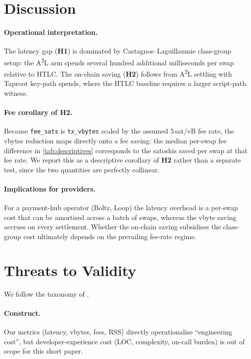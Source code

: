 \documentclass[sigconf,nonacm]{acmart}
\newcommand{\atwol}{A\textsuperscript{2}L\xspace}
\newcommand{\hyplabel}[1]{\textbf{H#1}}
\newcommand{\code}[1]{\texttt{\small #1}}
\begin{document}
\section{Discussion}
\label{sec:discussion}

\paragraph*{Operational interpretation.}
The latency gap (\hyplabel{1}) is dominated by Castagnos--Laguillaumie
class-group setup: the \atwol arm spends several hundred additional
milliseconds per swap relative to HTLC. The on-chain saving (\hyplabel{2})
follows from \atwol settling with Taproot key-path spends, where the HTLC
baseline requires a larger script-path witness.

\paragraph*{Fee corollary of \hyplabel{2}.}
Because \code{fee\_sats} is \code{tx\_vbytes} scaled by the assumed
5\,sat/vB fee rate, the vbytes reduction maps directly onto a fee saving:
the median per-swap fee difference in \cref{tab:descriptives} corresponds
to the satoshis saved per swap at that fee rate. We report this as a
descriptive corollary of \hyplabel{2} rather than a separate test, since
the two quantities are perfectly collinear.

\paragraph*{Implications for providers.}
For a payment-hub operator (Boltz, Loop) the latency overhead is a
per-swap cost that can be amortised across a batch of swaps, whereas the
vbyte saving accrues on every settlement. Whether the on-chain saving
subsidises the class-group cost ultimately depends on the prevailing
fee-rate regime.

\section{Threats to Validity}
\label{sec:threats}

We follow the taxonomy of \citet{wohlin2012experimentation}.

\paragraph*{Construct.}
Our metrics (latency, vbytes, fees, RSS) directly operationalise
``engineering cost'', but developer-experience cost (LOC, complexity,
on-call burden) is out of scope for this short paper.
\end{document}
